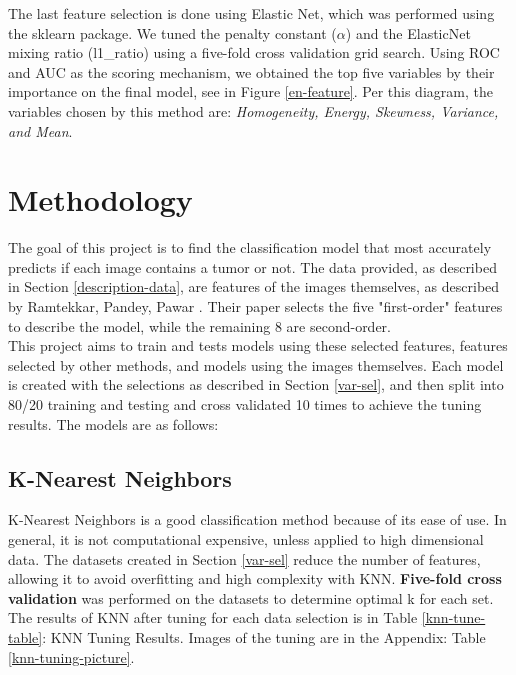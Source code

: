 \documentclass{article}
\begin{document}
The last feature selection is done using Elastic Net, which was performed using the sklearn package. We tuned the penalty constant ($\alpha$) and the ElasticNet mixing ratio (l1\_ratio) using a five-fold cross validation grid search. Using ROC and AUC as the scoring mechanism, we obtained the top five variables by their importance on the final model, see in Figure \ref{en-feature}. Per this diagram, the variables chosen by this method are: \textit { Homogeneity, Energy, Skewness, Variance, and Mean}.



\section{Methodology}

The goal of this project is to find the classification model that most accurately predicts if each image contains a tumor or not. The data provided, as described in Section \ref{description-data}, are features of the images themselves, as described by Ramtekkar, Pandey, Pawar \cite{accurate-detection}. Their paper selects the five "first-order" features to describe the model, while the remaining 8 are second-order. \\

This project aims to train and tests models using these selected features, features selected by other methods, and models using the images themselves. Each model is created with the selections as described in Section \ref{var-sel}, and then split into 80/20 training and testing and cross validated 10 times to achieve the tuning results. The models are as follows:

\subsection{K-Nearest Neighbors}

 K-Nearest Neighbors is a good classification method because of its ease of use. In general, it is not computational expensive, unless applied to high dimensional data. The datasets created in Section \ref{var-sel} reduce the number of features, allowing it to avoid overfitting and high complexity with KNN. \textbf{Five-fold cross validation} was performed on the datasets to determine optimal k for each set.\\

The results of KNN after tuning for each data selection is in Table \ref{knn-tune-table}: KNN Tuning Results. Images of the tuning are in the Appendix: Table \ref{knn-tuning-picture}.
\end{document}
